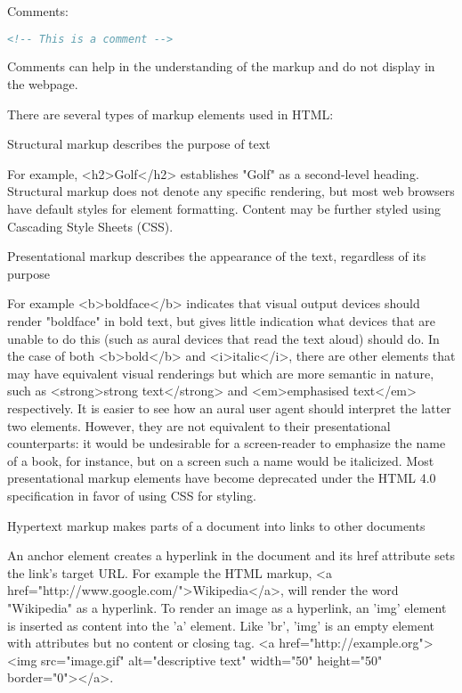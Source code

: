Comments:

\begin{lstlisting}[language=HTML]
	<!-- This is a comment -->
\end{lstlisting}

Comments can help in the understanding of the markup and do not display in the webpage.

There are several types of markup elements used in HTML:

\begin{compactitem}

\item Structural markup describes the purpose of text

For example, <h2>Golf</h2> establishes "Golf" as a second-level heading. Structural markup does not denote any specific rendering, but most web browsers have default styles for element formatting. Content may be further styled using Cascading Style Sheets (CSS).

\item Presentational markup describes the appearance of the text, regardless of its purpose

For example <b>boldface</b> indicates that visual output devices should render "boldface" in bold text, but gives little indication what devices that are unable to do this (such as aural devices that read the text aloud) should do. In the case of both <b>bold</b> and <i>italic</i>, there are other elements that may have equivalent visual renderings but which are more semantic in nature, such as <strong>strong text</strong> and <em>emphasised text</em> respectively. It is easier to see how an aural user agent should interpret the latter two elements. However, they are not equivalent to their presentational counterparts: it would be undesirable for a screen-reader to emphasize the name of a book, for instance, but on a screen such a name would be italicized. Most presentational markup elements have become deprecated under the HTML 4.0 specification in favor of using CSS for styling.

\item Hypertext markup makes parts of a document into links to other documents

An anchor element creates a hyperlink in the document and its href attribute sets the link's target URL. For example the HTML markup, <a href="http://www.google.com/">Wikipedia</a>, will render the word "Wikipedia" as a hyperlink. To render an image as a hyperlink, an 'img' element is inserted as content into the 'a' element. Like 'br', 'img' is an empty element with attributes but no content or closing tag. <a href="http://example.org"><img src="image.gif" alt="descriptive text" width="50" height="50" border="0"></a>.

\end{compactitem}



